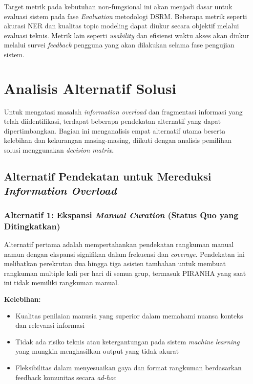 Target metrik pada kebutuhan non-fungsional ini akan menjadi dasar untuk evaluasi sistem pada fase \textit{Evaluation} metodologi DSRM. Beberapa metrik seperti akurasi NER dan kualitas topic modeling dapat diukur secara objektif melalui evaluasi teknis. Metrik lain seperti \textit{usability} dan efisiensi waktu akses akan diukur melalui survei \textit{feedback} pengguna yang akan dilakukan selama fase pengujian sistem.

\section{Analisis Alternatif Solusi}
\label{sec:alternatif-solusi}

Untuk mengatasi masalah \textit{information overload} dan fragmentasi informasi yang telah diidentifikasi, terdapat beberapa pendekatan alternatif yang dapat dipertimbangkan. Bagian ini menganalisis empat alternatif utama beserta kelebihan dan kekurangan masing-masing, diikuti dengan analisis pemilihan solusi menggunakan \textit{decision matrix}.

\subsection{Alternatif Pendekatan untuk Mereduksi \textit{Information Overload}}

\subsubsection{Alternatif 1: Ekspansi \textit{Manual Curation} (Status Quo yang Ditingkatkan)}

Alternatif pertama adalah mempertahankan pendekatan rangkuman manual namun dengan ekspansi signifikan dalam frekuensi dan \textit{coverage}. Pendekatan ini melibatkan perekrutan dua hingga tiga asisten tambahan untuk membuat rangkuman multiple kali per hari di semua grup, termasuk PIRANHA yang saat ini tidak memiliki rangkuman manual.

\textbf{Kelebihan:}
\begin{itemize}
\item Kualitas penilaian manusia yang superior dalam memahami nuansa konteks dan relevansi informasi
\item Tidak ada risiko teknis atau ketergantungan pada sistem \textit{machine learning} yang mungkin menghasilkan output yang tidak akurat
\item Fleksibilitas dalam menyesuaikan gaya dan format rangkuman berdasarkan feedback komunitas secara \textit{ad-hoc}
\end{itemize}

